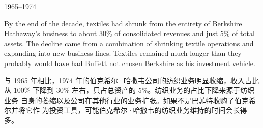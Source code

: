 \begin{section}{1965--1974}
\begin{verseparallel}
{  }
\end{verseparallel}

\begin{verseparallel}
  {
    By the end of the decade, textiles had shrunk from the entirety of Berkshire
    Hathaway's business to about 30\% of consolidated revenues and just 5\% of
    total assets. The decline came from a combination of shrinking textile
    operations and expanding into new business lines. Textiles remained much
    longer than they probably would have had Buffett not chosen Berkshire as his
    investment vehicle. \\
  }
  {
    
    与 1965 年相比，1974 年的伯克希尔·哈撒韦公司的纺织业务明显收缩，收入占比
    从 100\% 下降到 30\% 左右，只占总资产的 5\%。纺织业务的占比下降来源于纺织业务
    自身的萎缩以及公司在其他行业的业务扩张。如果不是巴菲特收购了伯克希尔并将它作
    为投资工具，可能伯克希尔·哈撒韦的纺织业务维持的时间会长得多。

  }
\end{verseparallel}
\end{section}

